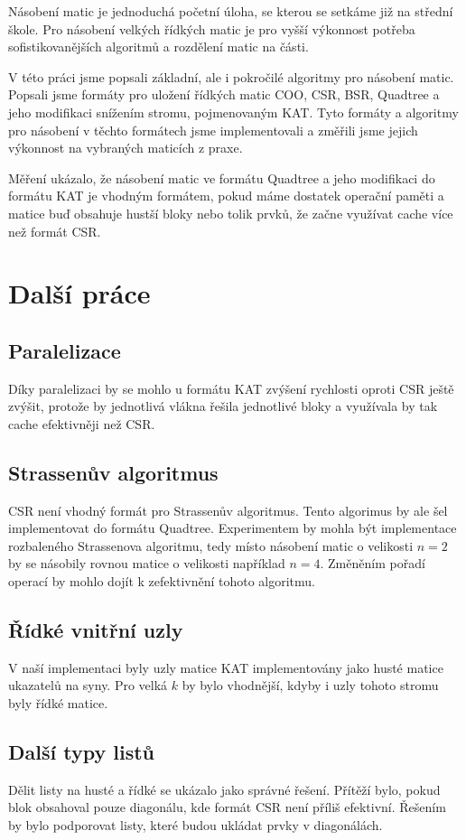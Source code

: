 \documentclass[thesis=B,czech]{FITthesis}[2012/06/26]
\begin{document}
\begin{conclusion}

Násobení matic je jednoduchá početní úloha, se kterou se setkáme již na střední škole. Pro násobení velkých řídkých matic je pro vyšší výkonnost potřeba  sofistikovanějších algoritmů a rozdělení matic na části.

V této práci jsme popsali základní, ale i pokročilé algoritmy pro násobení matic. Popsali jsme formáty pro uložení řídkých matic COO, CSR, BSR, Quadtree a jeho modifikaci snížením stromu, pojmenovaným KAT. Tyto formáty a algoritmy pro násobení v těchto formátech jsme implementovali a změřili jsme jejich výkonnost na vybraných maticích z praxe.

Měření ukázalo, že násobení matic ve formátu Quadtree a jeho modifikaci do formátu KAT je vhodným formátem, pokud máme dostatek operační paměti a matice buď obsahuje hustší bloky nebo tolik prvků, že začne využívat cache více než formát CSR.

\section{Další práce}

\subsection{Paralelizace}

Díky paralelizaci by se mohlo u formátu KAT zvýšení rychlosti oproti CSR ještě zvýšit, protože by jednotlivá vlákna řešila jednotlivé bloky a využívala by tak cache efektivněji než CSR. 

\subsection{Strassenův algoritmus}

CSR není vhodný formát pro Strassenův algoritmus. Tento algorimus by ale šel implementovat do formátu Quadtree. Experimentem by mohla být implementace rozbaleného Strassenova algoritmu, tedy místo násobení matic o velikosti $n = 2$ by se násobily rovnou matice o velikosti například $n = 4$. Změněním pořadí operací by mohlo dojít k zefektivnění tohoto algoritmu. 

\subsection{Řídké vnitřní uzly}
	
V naší implementaci byly uzly matice KAT implementovány jako husté matice ukazatelů na syny. Pro velká $k$ by bylo vhodnější, kdyby i uzly tohoto stromu byly řídké matice.	

\subsection{Další typy listů}

Dělit listy na husté a řídké se ukázalo jako správné řešení. Přítěží bylo, pokud blok obsahoval pouze diagonálu, kde formát CSR není příliš efektivní. Řešením by bylo podporovat listy, které budou ukládat prvky v diagonálách.

\end{conclusion}
\end{document}
